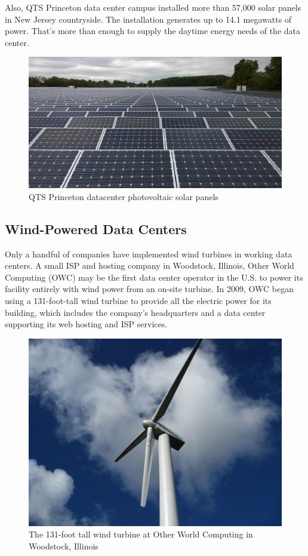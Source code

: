         Also, QTS Princeton data center campus installed more than 57,000 solar panels in New Jersey countryside.
        The installation generates up to 14.1 megawatts of power. That's more than enough to supply the daytime
        energy needs of the data center\cite{qts-princeton-data-centers}.

        \begin{figure}[!h]\centering
            \includegraphics[width=.4\columnwidth]{3-State-of-the-art/figs/qts-solar-panels.jpg}
            \caption{QTS Princeton datacenter photovoltaic solar panels}
        \end{figure}

    \subsection{Wind-Powered Data Centers}
        Only a handful of companies have implemented wind turbines in working data centers.
        A small ISP and hosting company in Woodstock, Illinois, Other World Computing (OWC) may be the first
        data center operator in the U.S. to power its facility entirely with wind power from an on-site turbine.
        In 2009, OWC began using a 131-foot-tall wind turbine to provide all the electric power for its
        building, which includes the company’s headquarters and a data center supporting its web hosting and
        ISP services\cite{wind-powered-data-centers}.

        \begin{figure}[!h]\centering
            \includegraphics[width=.4\columnwidth]{3-State-of-the-art/figs/owc-wind-turbine.jpg}
            \caption{The 131-foot tall wind turbine at Other World Computing in Woodstock, Illinois}
        \end{figure}

